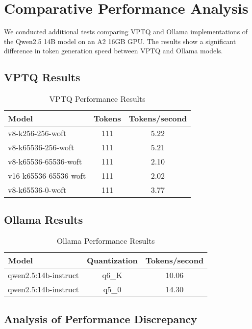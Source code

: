 \documentclass{article}
\begin{document}
\section{Comparative Performance Analysis}

We conducted additional tests comparing VPTQ and Ollama implementations of the Qwen2.5 14B model on an A2 16GB GPU. The results show a significant difference in token generation speed between VPTQ and Ollama models.

\subsection{VPTQ Results}

\begin{table}[h]
\centering
\begin{tabular}{lcc}
\toprule
Model & Tokens & Tokens/second \\
\midrule
v8-k256-256-woft & 111 & 5.22 \\
v8-k65536-256-woft & 111 & 5.21 \\
v8-k65536-65536-woft & 111 & 2.10 \\
v16-k65536-65536-woft & 111 & 2.02 \\
v8-k65536-0-woft & 111 & 3.77 \\
\bottomrule
\end{tabular}
\caption{VPTQ Performance Results}
\label{tab:vptq-results}
\end{table}

\subsection{Ollama Results}

\begin{table}[h]
\centering
\begin{tabular}{lcc}
\toprule
Model & Quantization & Tokens/second \\
\midrule
qwen2.5:14b-instruct & q6\_K & 10.06 \\
qwen2.5:14b-instruct & q5\_0 & 14.30 \\
\bottomrule
\end{tabular}
\caption{Ollama Performance Results}
\label{tab:ollama-results}
\end{table}

\subsection{Analysis of Performance Discrepancy}
\end{document}
